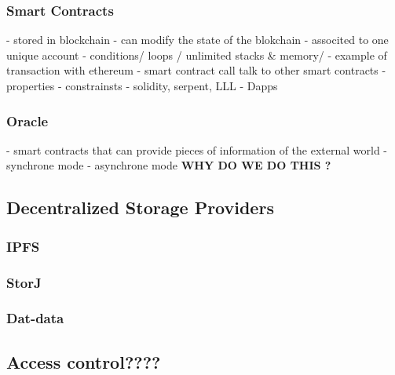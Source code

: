   \subsubsection{Smart Contracts}
- stored in blockchain
\newline
- can modify the state of the blokchain
\newline
- associted to one unique account
\newline
- conditions/ loops / unlimited stacks \& memory/
\newline
- example of transaction with ethereum
\newline
- smart contract call talk to other smart contracts  
\newline
- properties 
- constrainsts
\newline
- solidity, serpent, LLL
\newline
- Dapps
\subsubsection{Oracle}
- smart contracts that can provide pieces of information of the external world
\newline
- synchrone mode
\newline
- asynchrone mode
\newline
\textbf{WHY DO WE DO THIS ?}
\subsection{Decentralized Storage Providers}

\subsubsection{IPFS}

\subsubsection{StorJ}

\subsubsection{Dat-data}



\subsection{Access control????}


